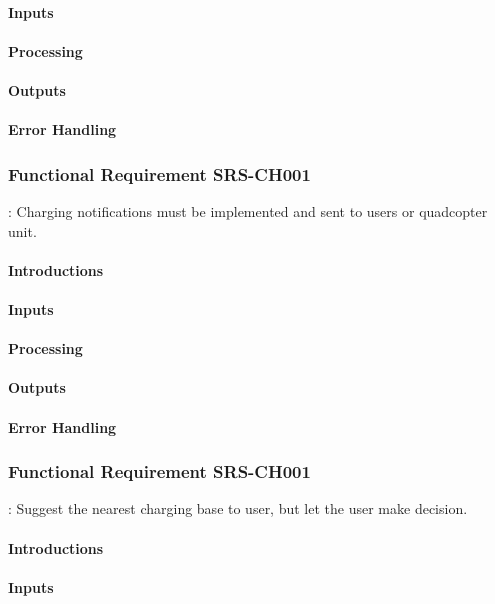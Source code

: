 \documentclass[a4paper]{article}
\begin{document}
\paragraph{Inputs}
\paragraph{Processing}
\paragraph{Outputs}
\paragraph{Error Handling}

\subsubsection{Functional Requirement SRS-CH001}
: Charging notifications must be implemented and sent to users or quadcopter unit.
\paragraph{Introductions}
\paragraph{Inputs}
\paragraph{Processing}
\paragraph{Outputs}
\paragraph{Error Handling}

\subsubsection{Functional Requirement SRS-CH001}
: Suggest the nearest charging base to user, but let the user make decision.
\paragraph{Introductions}
\paragraph{Inputs}
\end{document}
